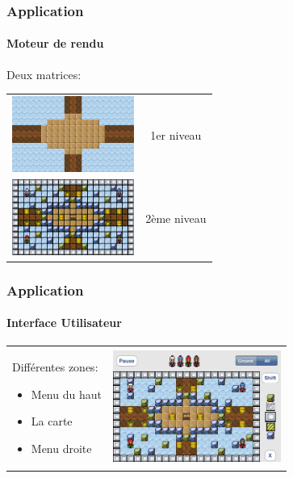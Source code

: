 	\begin{frame}
		\frametitle{Application}
		\framesubtitle{Moteur de rendu}		
		
		Deux matrices:
		\begin{center}
			\begin{tabular}{cc}
				\includegraphics[width=4cm]{./img/img10.png} & 1er niveau \\
				\includegraphics[width=4cm]{./img/img9.png} & 2ème niveau \\
			\end{tabular}
		\end{center}
	\end{frame}
	
	
	\begin{frame}
		\frametitle{Application}
		\framesubtitle{Interface Utilisateur}
		
		\begin{center}
        	\begin{tabular}{ll}
                       		\begin{minipage}{4cm}
					Différentes zones:
                                       	\begin{itemize}
                                   	 		\item Menu du haut
						\item La carte
						\item Menu droite
                                    		\end{itemize}
                       		\end{minipage}  &                
                       		\begin{minipage}{5.5cm}
                                		\includegraphics[width=5.5cm]{./img/img8.png}
                       		\end{minipage}\\
               		\end{tabular}
               	\end{center}
	\end{frame}
	
